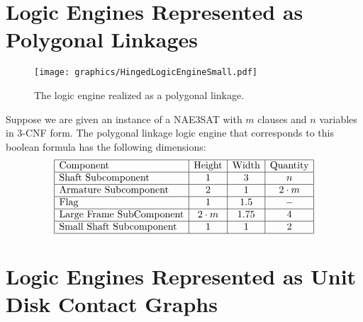 \section{Logic Engines Represented as Polygonal Linkages}         
\begin{figure}[!htbp]
\begin{center}
\texttt{[image: graphics/HingedLogicEngineSmall.pdf]}
\caption{The logic engine realized as a polygonal linkage.}\label{fig:HingedLogicEngineSmall.pdf}
\end{center}
\end{figure}
Suppose we are given an instance of a NAE3SAT with $m$ clauses and $n$ variables in 3-CNF form.  
The polygonal linkage logic engine that corresponds to this boolean formula has the following 
dimensions:
$$\begin{array}{|l|c|c|c|}
 \hline
 \text{Component} & \text{Height} & \text{Width} & \text{Quantity}\\\hline
 \text{Shaft Subcomponent} & 1 & 3 & n\\\hline
 \text{Armature Subcomponent} & 2 & 1 & 2\cdot m\\\hline
 \text{Flag} & 1 & 1.5 & -\\\hline
 \text{Large Frame SubComponent} & 2\cdot m & 1.75 & 4\\\hline
 \text{Small Shaft Subcomponent} & 1 & 1 & 2\\\hline
\end{array}$$


\section{Logic Engines Represented as Unit Disk Contact Graphs}
